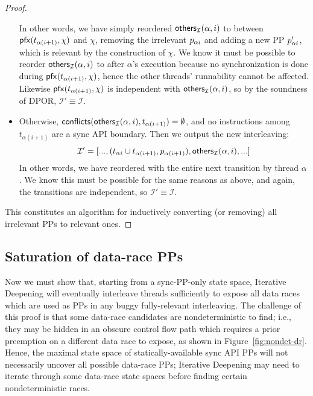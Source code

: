 \begin{proof}
\begin{itemize}
			In other words, we have simply reordered $\mathsf{others}_{\mathcal{I}}(\alpha,i)$ to between $\mathsf{pfx}(t_{\alpha{}(i+1)},\chi)$ and $\chi$, removing the irrelevant $p_{\alpha{}i}$ and adding a new PP $p_{\alpha{}i}'$, which is relevant by the construction of $\chi$.
			We know it must be possible to reorder $\mathsf{others}_{\mathcal{I}}(\alpha,i)$ to after $\alpha$'s execution because no synchronization is done during $\mathsf{pfx}(t_{\alpha{}(i+1)},\chi)$, hence the other threads' runnability cannot be affected.
			Likewise $\mathsf{pfx}(t_{\alpha{}(i+1)},\chi)$ is independent with $\mathsf{others}_{\mathcal{I}}(\alpha,i)$, so by the soundness of DPOR, $\mathcal{I}' \equiv \mathcal{I}$.
		\item Otherwise, $\mathsf{conflicts}(\mathsf{others}_{\mathcal{I}}(\alpha,i),t_{\alpha{}(i+1)}) = \emptyset$, and no instructions among $t_{\alpha{}(i+1)}$ are a sync API boundary.
			Then we output the new interleaving:
			\[
				\mathcal{I}' = [..., (t_{\alpha{}i} \cup t_{\alpha(i+1)}, p_{\alpha(i+1)}), \mathsf{others}_{\mathcal{I}}(\alpha,i),...]
			\]
			In other words, we have reordered {} with the entire next transition by thread $\alpha$.
			We know this must be possible for the same reasons as above, and again, the transitions are independent, so $\mathcal{I}' \equiv \mathcal{I}$.
	\end{itemize}
	This constitutes an algorithm for inductively converting (or removing) all irrelevant PPs to relevant ones.
\end{proof}


\subsection{Saturation of data-race PPs}

Now we must show that, starting from a sync-PP-only state space,
Iterative Deepening will eventually interleave threads sufficiently to expose all data races which are used as PPs in any buggy fully-relevant interleaving.
The challenge of this proof is that some data-race candidates are nondeterministic to find;
i.e., they may be hidden in an obscure control flow path which requires a prior preemption on a different data race to expose,
as shown in Figure~\ref{fig:nondet-dr}.
Hence, the maximal state space of statically-available sync API PPs will not necessarily uncover all possible data-race PPs;
Iterative Deepening may need to iterate through some data-race state spaces before finding certain nondeterministic races.

